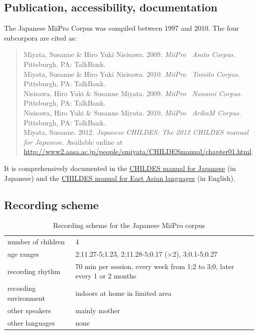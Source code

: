 \documentclass[a4paper, 11pt]{book}
\begin{document}
\subsection{Publication, accessibility, documentation}
The Japanese MiiPro Corpus \citep{Miyata_etal2009a, Nisisawa_etal2009a, Miyata_etal2010a, Nisisawa_etal2010a, Miyata2012a} was compiled between 1997 and 2010. The four subcorpora are cited as:

\begin{quote}
	Miyata, Susanne \& Hiro Yuki Nisisawa. 2009. \emph{MiiPro \textendash\ Asato Corpus.} Pittsburgh, PA: TalkBank. \\ %
	Miyata, Susanne \& Hiro Yuki Nisisawa. 2010. \emph{MiiPro \textendash\ Tomito Corpus.} Pittsburgh, PA: TalkBank. \\ %
	Nisisawa, Hiro Yuki \& Susanne Miyata. 2009. \emph{MiiPro \textendash\ Nanami Corpus.} Pittsburgh, PA: TalkBank. \\ %
	Nisisawa, Hiro Yuki \& Susanne Miyata. 2010. \emph{MiiPro \textendash\ ArikaM Corpus.} Pittsburgh, PA: TalkBank. \\ %
	Miyata, Susanne. 2012. \emph{Japanese CHILDES: The 2012 CHILDES manual for Japanese.} Available online at \url{http://www2.aasa.ac.jp/people/smiyata/CHILDESmanual/chapter01.html}.
\end{quote}

It is comprehensively documented in the \href{http://www2.aasa.ac.jp/people/smiyata/CHILDESmanual/chapter01.html}{CHILDES manual for Japanese} (in Japanese) and the \href{http://childes.psy.cmu.edu/manuals/10eastasian.pdf}{CHILDES manual for East Asian languages} (in English). 

\subsection{Recording scheme}

\begin{table}[ht]
	\centering
	\begin{tabular}{ll}
		\toprule
		number of children 	& 4 \\
		age ranges 			& 2;11.27-5;1.23, 2;11.28-5;0.17 (×2), 3;0.1-5;0.27 \\
		recording rhythm 	& 70 min per session, every week from 1;2 to 3;0, later every 1 or 2 months \\
		recording environment & indoors at home in limited area \\
		other speakers 		& mainly mother \\
		other languages		& none \\
		\bottomrule
	\end{tabular}
	\caption{Recording scheme for the Japanese MiiPro corpus}
	\label{tab:Japanese MiiPro recording scheme}
\end{table}
\end{document}

